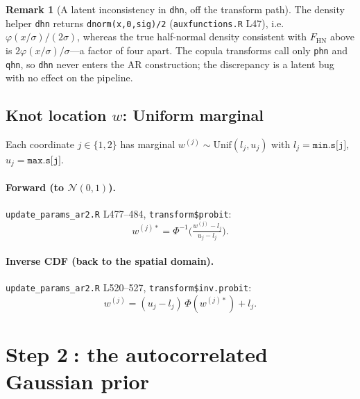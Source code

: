 \documentclass[11pt]{article}
\theoremstyle{definition}
\newtheorem{remark}{Remark}
\newcommand{\Norm}{\mathcal{N}}
\newcommand{\Unif}{\mathrm{Unif}}
\newcommand{\HN}{\mathrm{HN}}
\newcommand{\Phinv}{\Phi^{-1}}
\newcommand{\code}[1]{\texttt{#1}}
\begin{document}
\begin{remark}[A latent inconsistency in \code{dhn}, off the transform path]
The density helper \code{dhn} returns \code{dnorm(x,0,sig)/2} (\code{auxfunctions.R} L47),
i.e.\ $\varphi(x/\sigma)/(2\sigma)$, whereas the true half-normal density consistent
with $F_\HN$ above is $2\varphi(x/\sigma)/\sigma$---a factor of four apart. The copula
transforms call only \code{phn} and \code{qhn}, so \code{dhn} never enters the AR
construction; the discrepancy is a latent bug with no effect on the pipeline.
\end{remark}

\subsection{Knot location $w$: Uniform marginal}
Each coordinate $j\in\{1,2\}$ has marginal $w^{(j)}\sim\Unif(l_j,u_j)$ with
$l_j=\code{min.s[j]}$, $u_j=\code{max.s[j]}$.

\paragraph{Forward (to $\Norm(0,1)$).}
\code{update\_params\_ar2.R} L477--484, \code{transform\$probit}:
\begin{equation}
w^{(j)\ast} = \Phinv\!\Big(\tfrac{w^{(j)} - l_j}{u_j - l_j}\Big).
\end{equation}

\paragraph{Inverse CDF (back to the spatial domain).}
\code{update\_params\_ar2.R} L520--527, \code{transform\$inv.probit}:
\begin{equation}
w^{(j)} = (u_j - l_j)\,\Phi(w^{(j)\ast}) + l_j.
\end{equation}

\section{Step \textcircled{2}: the autocorrelated Gaussian prior}
\label{sec:prior}
\end{document}
